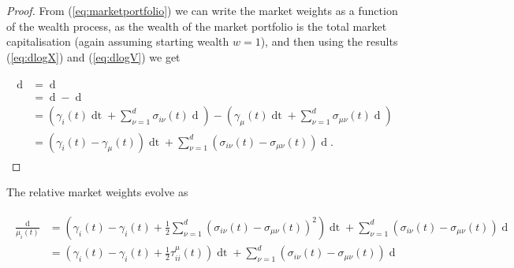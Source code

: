 \documentclass[british]{amsart} \usepackage{lmodern}
\numberwithin{equation}{section} \numberwithin{figure}{section}
\theoremstyle{plain} \newtheorem{thm}{\protect\theoremname}[section]
\theoremstyle{definition} \newtheorem{defn}[thm]{\protect\definitionname}
\theoremstyle{plain} \newtheorem{assumption}[thm]{\protect\assumptionname}
\theoremstyle{plain} \newtheorem{lem}[thm]{\protect\lemmaname}
\theoremstyle{plain} \newtheorem{prop}[thm]{\protect\propositionname}
\theoremstyle{remark} \newtheorem{rem}[thm]{\protect\remarkname}
\theoremstyle{plain} \newtheorem{cor}[thm]{\protect\corollaryname}
\renewcommand{\d}[1]{\mathop{\mathrm{d}{#1}}}
\newcommand{\Vmu}{V^{\mu}}
\begin{document}
\begin{proof}
  
  From (\ref{eq:marketportfolio}) we can write the market weights as a function
  of the wealth process, as the wealth of the market portfolio is the total market
  capitalisation (again assuming starting wealth $w=1$), and then using the results 
  (\ref{eq:dlogX}) and (\ref{eq:dlogV}) we get

  \begin{gather} 
    \begin{split} 
      \d{\log{\mu_{i}(t)}} 
        &= \d{\log{ \left( \frac{ X_{i}(t) }{ \Vmu(t) } \right)}}  \\
        &= \d{ \log{X_{i}(t)} } - \d{ \log{\Vmu(t)} } \\ 
        &= 
            \left(
              \gamma_{i}(t) \d{t} + \sum_{\nu=1}^{d} \sigma_{i\nu}(t) \d{W_{\nu}(t)}
            \right) -
            \left(
              \gamma_{\mu}(t)\d{t} + \sum_{\nu=1}^{d} \sigma_{\mu\nu}(t) \d{W_{\nu}(t)} 
            \right) \\
        &=
            (\gamma_{i}(t) - \gamma_{\mu}(t))\d{t} +
              \sum_{\nu=1}^{d} 
              \left( 
                \sigma_{i\nu}(t) - \sigma_{\mu\nu}(t) 
              \right) \d{W_{\nu}(t)}. 
    \end{split} 
  \end{gather}

\end{proof}

The relative market weights evolve as

  \begin{gather} 
    \label{eq:relativemarketweights}
    \begin{split} 
      \frac{\d{\mu_{i}(t)}}{\mu_{i}(t)} &=
        \left(
         \gamma_{i}(t) - \gamma_{i}(t) + \frac{1}{2} 
            \sum_{\nu=1}^{d}
            \left(
              \sigma_{i\nu}(t) - \sigma_{\mu\nu}(t)
            \right) ^ 2
        \right) \d{t} + 
        \sum_{\nu=1}^{d}
        \left(
          \sigma_{i\nu}(t) - \sigma_{\mu\nu}(t)
        \right) \d{W_{\nu}(t)}  \\
        &=
        \left(
         \gamma_{i}(t) - \gamma_{i}(t) + \frac{1}{2} \tau_{ii}^{\mu}(t)
        \right) \d{t} + 
        \sum_{\nu=1}^{d}
        \left(
          \sigma_{i\nu}(t) - \sigma_{\mu\nu}(t)
        \right) \d{W_{\nu}(t)}  \\
    \end{split}
  \end{gather}
\end{document}
